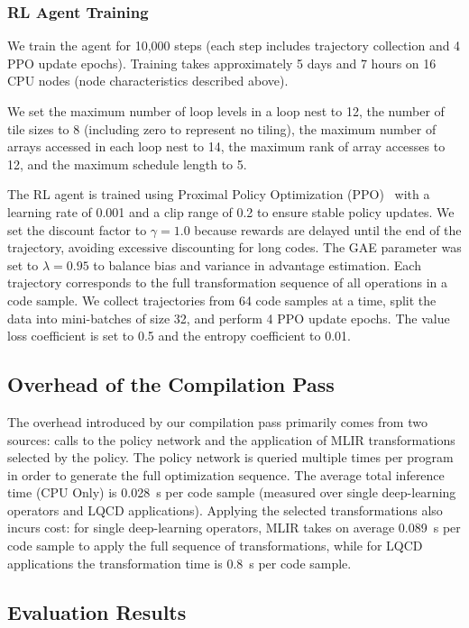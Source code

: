 \documentclass[10pt,twocolumn]{article}
\begin{document}
\subsubsection{RL Agent Training}
We train the agent for 10,000 steps (each step includes trajectory collection and 4 PPO update epochs). Training takes approximately 5 days and 7 hours on 16 CPU nodes (node characteristics described above).

We set the maximum number of loop levels in a loop nest to 12, the number of tile sizes to 8 (including zero to represent no tiling), the maximum number of arrays accessed in each loop nest to 14, the maximum rank of array accesses to 12, and the maximum schedule length to 5.

The RL agent is trained using Proximal Policy Optimization (PPO)~\cite{ref55} with a learning rate of 0.001 and a clip range of 0.2 to ensure stable policy updates. We set the discount factor to $\gamma = 1.0$ because rewards are delayed until the end of the trajectory, avoiding excessive discounting for long codes. The GAE parameter was set to $\lambda = 0.95$ to balance bias and variance in advantage estimation. Each trajectory corresponds to the full transformation sequence of all operations in a code sample. We collect trajectories from 64 code samples at a time, split the data into mini-batches of size 32, and perform 4 PPO update epochs. The value loss coefficient is set to 0.5 and the entropy coefficient to 0.01.

\subsection{Overhead of the Compilation Pass}

The overhead introduced by our compilation pass primarily comes from two sources: calls to the policy network and the application of MLIR transformations selected by the policy. The policy network is queried multiple times per program in order to generate the full optimization sequence. The average total inference time (CPU Only) is 0.028~s per code sample (measured over single deep-learning operators and LQCD applications). Applying the selected transformations also incurs cost: for single deep-learning operators, MLIR takes on average 0.089~s per code sample to apply the full sequence of transformations, while for LQCD applications the transformation time is 0.8~s per code sample.

\subsection{Evaluation Results}
\end{document}
